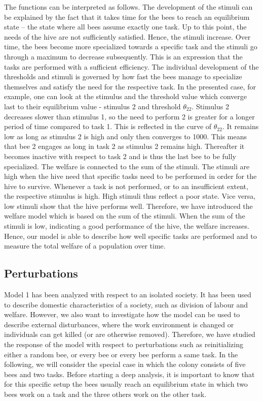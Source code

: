 The functions can be interpreted as follows. The development of the stimuli can be explained by the fact that it takes time for the bees to reach an equilibrium state -- the state where all bees assume exactly one task. Up to this point, the needs of the hive are not sufficiently satisfied. Hence, the stimuli increase. Over time, the bees become more specialized towards a specific task and the stimuli go through a maximum to decrease subsequently. This is an expression that the tasks are performed with a sufficient efficiency. The individual development of the thresholds and stimuli is governed by how fast the bees manage to specialize themselves and satisfy the need for the respective task. In the presented case, for example, one can look at the stimulus and the threshold value which converge last to their equilibrium value - stimulus 2 and threshold $\theta_{22}$. Stimulus 2 decreases slower than stimulus 1, so the need to perform 2 is greater for a longer period of time compared to task 1. This is reflected in the curve of $\theta_{22}$. It remains low as long as stimulus 2 is high and only then converges to 1000. This means that bee 2 engages as long in task 2 as stimulus 2 remains high. Thereafter it becomes inactive with respect to task 2 and is thus the last bee to be fully specialized. The welfare is connected to the sum of the stimuli. The stimuli are high when the hive need that specific tasks need to be performed in order for the hive to survive. Whenever a task is not performed, or to an insufficient extent, the respective stimulus is high. High stimuli thus reflect a poor state. Vice versa, low stimuli show that the hive performs well. Therefore, we have introduced the welfare model which is based on the sum of the stimuli. When the sum of the stimuli is low, indicating a good performance of the hive, the welfare increases. Hence, our model is able to describe how well specific tasks are performed and to measure the total welfare of a population over time.

\subsection{Perturbations}
Model 1 has been analyzed with respect to an isolated society. It has been used to describe domestic characteristics of a society, such as division of labour and welfare. However, we also want to investigate how the model can be used to describe external disturbances, where the work environment is changed or individuals can get killed (or are otherwise removed). Therefore, we have studied the response of the model with respect to perturbations such as reinitializing either a random bee, or every bee or every bee perform a same task.
In the following, we will consider the special case in which the colony consists of five bees and two tasks. Before starting a deep analysis, it is important to know that for this specific setup the bees usually reach an equilibrium state in which two bees work on a task and the three others work on the other task. 

